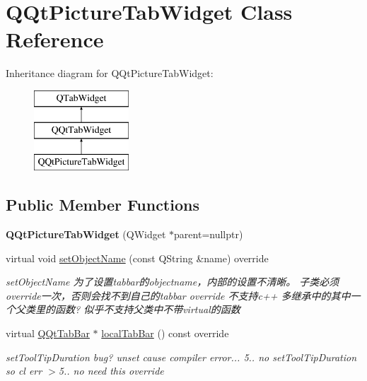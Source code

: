 \hypertarget{class_q_qt_picture_tab_widget}{}\section{Q\+Qt\+Picture\+Tab\+Widget Class Reference}
\label{class_q_qt_picture_tab_widget}
Inheritance diagram for Q\+Qt\+Picture\+Tab\+Widget\+:\begin{figure}[H]
\begin{center}
\leavevmode
\includegraphics[height=3.000000cm]{class_q_qt_picture_tab_widget}
\end{center}
\end{figure}
\subsection*{Public Member Functions}
\begin{DoxyCompactItemize}
\item 
\mbox{\label{class_q_qt_picture_tab_widget_a3ab6afca11b4b76279a5cdb1959b6939}} 
{\bfseries Q\+Qt\+Picture\+Tab\+Widget} (Q\+Widget $\ast$parent=nullptr)
\item 
virtual void \mbox{\hyperlink{class_q_qt_picture_tab_widget_ae7ac85c464230644bf9be4a5a636f6b4}{set\+Object\+Name}} (const Q\+String \&name) override
\begin{DoxyCompactList}\small\item\em set\+Object\+Name 为了设置tabbar的objectname，内部的设置不清晰。 子类必须override一次，否则会找不到自己的tabbar override 不支持c++ 多继承中的其中一个父类里的函数? 似乎不支持父类中不带virtual的函数 \end{DoxyCompactList}\item 
virtual \mbox{\hyperlink{class_q_qt_tab_bar}{Q\+Qt\+Tab\+Bar}} $\ast$ \mbox{\hyperlink{class_q_qt_picture_tab_widget_a75be29bbbc547eae8677eac9de7877b8}{local\+Tab\+Bar}} () const override
\begin{DoxyCompactList}\small\item\em set\+Tool\+Tip\+Duration bug? unset cause compiler error... 5.. no set\+Tool\+Tip\+Duration so cl err $>$5.. no need this override \end{DoxyCompactList}\end{DoxyCompactItemize}


